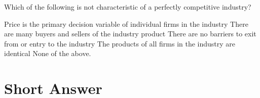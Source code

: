 \begin{questions}
  \question[2] Which of the following is not characteristic of a
  perfectly competitive industry?
  \begin{choices}
    \CorrectChoice Price is the primary decision variable of
    individual firms in the industry
    \choice There are many buyers and sellers of the industry product
    \choice There are no barriers to exit from or entry to the
    industry
    \choice The products of all firms in the industry are identical
    \choice None of the above.
  \end{choices}

  \section{Short Answer}


\end{questions}


